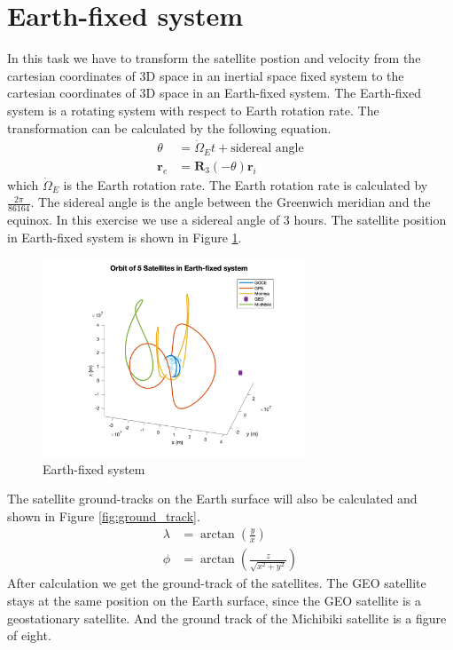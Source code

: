 \documentclass[12pt
,headinclude
,headsepline
,bibtotocnumbered
]{scrartcl}
\begin{document}
\section*{Earth-fixed system}
In this task we have to transform the satellite postion and velocity from the cartesian coordinates of 3D space in an inertial space fixed system to the cartesian coordinates of 3D space in an Earth-fixed system. The Earth-fixed system is a rotating system with respect to Earth rotation rate. The transformation can be calculated by the following equation.
\begin{align*}
    \theta&=\dot{\Omega}_Et+\text{sidereal angle}\\
    \boldsymbol{r}_e&=\boldsymbol{R}_3(-\theta)\boldsymbol{r}_i
\end{align*}
which $\dot{\Omega}_E$ is the Earth rotation rate. The Earth rotation rate is calculated by $\frac{2\pi}{86164}$. The sidereal angle is the angle between the Greenwich meridian and the equinox. In this exercise we use a sidereal angle of 3 hours. The satellite position in Earth-fixed system is shown in Figure \ref{fig:earth_fixed}.
\begin{figure}[H]
    \centering
    \includegraphics[width=0.7\textwidth]{plots/orbefix.png}
    \caption{Earth-fixed system}
    \label{fig:earth_fixed}
\end{figure}
The satellite ground-tracks on the Earth surface will also be calculated and shown in Figure \ref{fig:ground_track}.
\begin{align*}
    \lambda&=\arctan\left(\frac{y}{x}\right)\\
    \phi&=\arctan\left(\frac{z}{\sqrt{x^2+y^2}}\right)
\end{align*}
After calculation we get the ground-track of the satellites. The GEO satellite stays at the same position on the Earth surface, since the GEO satellite is a geostationary satellite. And the ground track of the Michibiki satellite is a figure of eight.
\end{document}
